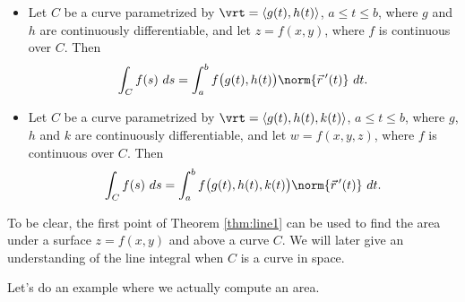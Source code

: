 {\begin{itemize}
	\item Let $C$ be a curve parametrized by $\vrt =\langle g(t), h(t)\rangle$, $a\leq t\leq b$, where $g$ and $h$ are continuously differentiable, and let $z=f(x,y)$, where $f$ is continuous over $C$. Then%
	$$\int_Cf(s)\ ds = \int_a^bf\big(g(t),h(t)\big)\norm{\vec r\,'(t)}\ dt.$$
	\item Let $C$ be a curve parametrized by $\vrt =\langle g(t), h(t),k(t)\rangle$, $a\leq t\leq b$, where $g$, $h$ and $k$ are continuously differentiable, and let $w=f(x,y,z)$, where $f$ is continuous over $C$. Then
	$$\int_Cf(s)\ ds = \int_a^bf\big(g(t),h(t),k(t)\big)\norm{\vec r\,'(t)}\ dt.$$
\end{itemize}
}

To be clear, the first point of Theorem \ref{thm:line1} can be used to find the area under a surface $z=f(x,y)$ and above a curve $C$. We will later give an understanding of the line integral when $C$ is a curve in space.

Let's do an example where we actually compute an area.\\

